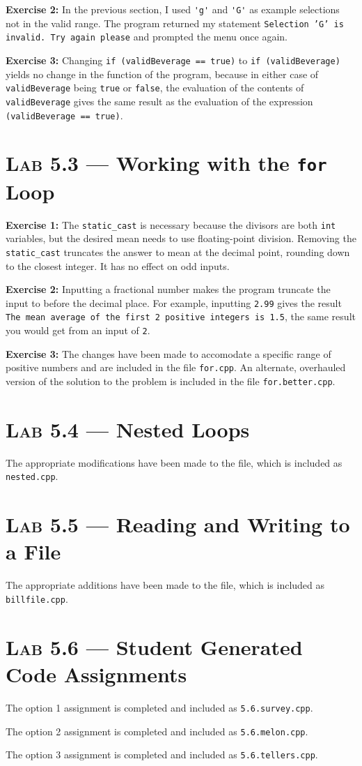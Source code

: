 \documentclass[11pt]{article}
\begin{document}
	\textbf{Exercise 2:} In the previous section, I used \lstinline{'g'} and \lstinline{'G'} as example selections not in the valid range. The program returned my statement \texttt{Selection 'G' is invalid. Try again please} and prompted the menu once again.
	
	\textbf{Exercise 3:} Changing \lstinline{if (validBeverage == true)} to \lstinline{if (validBeverage)} yields no change in the function of the program, because in either case of \lstinline{validBeverage} being \lstinline{true} or \lstinline{false}, the evaluation of the contents of \lstinline{validBeverage} gives the same result as the evaluation of the expression \lstinline{(validBeverage == true)}.
	

\section*{\textsc{Lab 5.3} --- Working with the \texttt{for} Loop}
	
	\textbf{Exercise 1:} The \lstinline{static_cast} is necessary because the divisors are both \lstinline{int} variables, but the desired mean needs to use floating-point division. Removing the \lstinline{static_cast} truncates the answer to mean at the decimal point, rounding down to the closest integer. It has no effect on odd inputs.
	
	\textbf{Exercise 2:} Inputting a fractional number makes the program truncate the input to before the decimal place. For example, inputting \texttt{2.99} gives the result \texttt{The mean average of the first 2 positive integers is 1.5}, the same result you would get from an input of \texttt{2}.
	
	\textbf{Exercise 3:} The changes have been made to accomodate a specific range of positive numbers and are included in the file \texttt{for.cpp}. An alternate, overhauled version of the solution to the problem is included in the file \texttt{for.better.cpp}.
	

\section*{\textsc{Lab 5.4} --- Nested Loops}
\noindent	The appropriate modifications have been made to the file, which is included as \texttt{nested.cpp}.
	

\section*{\textsc{Lab 5.5} --- Reading and Writing to a File}
\noindent	The appropriate additions have been made to the file, which is included as \texttt{billfile.cpp}.


\section*{\textsc{Lab 5.6} --- Student Generated Code Assignments}

	The option 1 assignment is completed and included as \texttt{5.6.survey.cpp}.
	
	The option 2 assignment is completed and included as \texttt{5.6.melon.cpp}.
	
	The option 3 assignment is completed and included as \texttt{5.6.tellers.cpp}.
\end{document}
